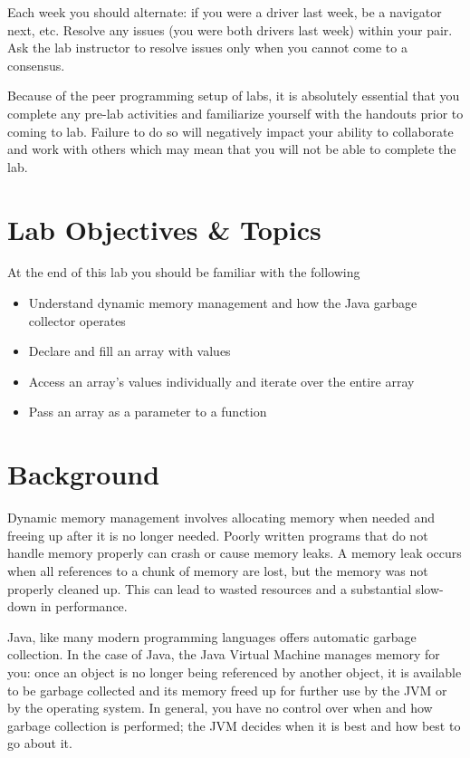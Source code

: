 \documentclass[12pt]{scrartcl}
\begin{document}
Each week you should alternate: if you were a driver last week, 
be a navigator next, etc.  Resolve any issues (you were both drivers
last week) within your pair.  Ask the lab instructor to resolve issues
only when you cannot come to a consensus.  

Because of the peer programming setup of labs, it is absolutely 
essential that you complete any pre-lab activities and familiarize
yourself with the handouts prior to coming to lab.  Failure to do
so will negatively impact your ability to collaborate and work with 
others which may mean that you will not be able to complete the
lab.  

\section{Lab Objectives \& Topics}
At the end of this lab you should be familiar with the following
\begin{itemize}
  \item Understand dynamic memory management and how the Java garbage collector operates
  \item Declare and fill an array with values
  \item Access an array's values individually and iterate over the entire array
  \item Pass an array as a parameter to a function
\end{itemize}

\section{Background}

Dynamic memory management involves allocating memory when 
needed and freeing up after it is no longer needed.  Poorly written 
programs that do not handle memory properly can crash or cause 
memory leaks.  A memory leak occurs when all references to a 
chunk of memory are lost, but the memory was not properly cleaned 
up.  This can lead to wasted resources and a substantial slow-down 
in performance.

Java, like many modern programming languages offers automatic 
garbage collection.  In the case of Java, the Java Virtual Machine 
manages memory for you: once an object is no longer being 
referenced by another object, it is available to be garbage collected 
and its memory freed up for further use by the JVM or by the operating 
system.  In general, you have no control over when and how garbage 
collection is performed; the JVM decides when it is best and how best 
to go about it.
\end{document}
